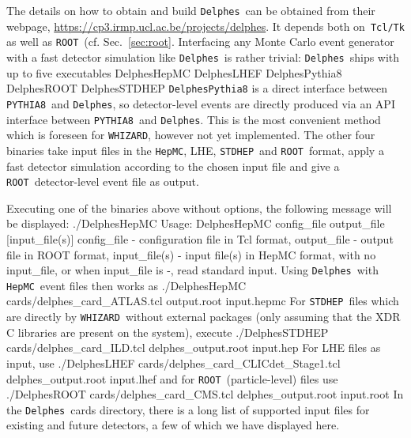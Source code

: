 \documentclass[12pt]{book}
\newenvironment{code}%
  {\begingroup\footnotesize
   \quote
   \Verbatim}%
  {\endVerbatim
   \endquote
   \endgroup\noindent}
\newcommand{\ttt}[1]{\texttt{#1}}
\newcommand{\whizard}{\ttt{WHIZARD}}
\newcommand{\pythiaeight}{\ttt{PYTHIA8}}
\newcommand{\stdhep}{\ttt{STDHEP}}
\newcommand{\hepmc}{\ttt{HepMC}}
\newcommand{\delphes}{\ttt{Delphes}}
\newcommand{\ROOT}{\ttt{ROOT}}
\begin{document}
The details on how to obtain and build \delphes\ can be obtained from
their webpage, \url{https://cp3.irmp.ucl.ac.be/projects/delphes}. It
depends both on~\ttt{Tcl/Tk} as well as
\ROOT~(cf. Sec.~\ref{sec:root}. Interfacing any Monte Carlo event
generator with a fast detector simulation like \delphes\ is rather
trivial: \delphes\ ships with up to five executables
\begin{code}
  DelphesHepMC
  DelphesLHEF
  DelphesPythia8
  DelphesROOT
  DelphesSTDHEP
\end{code}
\ttt{DelphesPythia8} is a direct interface between \pythiaeight\ and
\delphes, so detector-level events are directly produced via an API
interface between \pythiaeight\ and \delphes. This is the most
convenient method which is foreseen for \whizard, however not yet
implemented. The other four binaries take input files in the \hepmc,
LHE, \stdhep\ and \ROOT\ format, apply a fast detector simulation
according to the chosen input file and give a \ROOT\ detector-level
event file as output.

Executing one of the binaries above without options, the following
message will be displayed:
\begin{code}
  ./DelphesHepMC
 Usage: DelphesHepMC config_file output_file [input_file(s)]
 config_file - configuration file in Tcl format,
 output_file - output file in ROOT format,
 input_file(s) - input file(s) in HepMC format,
 with no input_file, or when input_file is -, read standard input.
\end{code}
Using \delphes\ with \hepmc\ event files then works as
\begin{code}
  ./DelphesHepMC cards/delphes_card_ATLAS.tcl output.root input.hepmc
\end{code}
For \stdhep\ files which are directly by \whizard\ without external
packages (only assuming that the XDR C libraries are present on the
system), execute
\begin{code}
  ./DelphesSTDHEP cards/delphes_card_ILD.tcl delphes_output.root input.hep
\end{code}
For LHE files as input, use
\begin{code}
  ./DelphesLHEF cards/delphes_card_CLICdet_Stage1.tcl delphes_output.root input.lhef
\end{code}
and for \ROOT\ (particle-level) files use
\begin{code}
  ./DelphesROOT cards/delphes_card_CMS.tcl delphes_output.root input.root
\end{code}
In the \delphes\ cards directory, there is a long list of supported
input files for existing and future detectors, a few of which we have
displayed here.
\end{document}
